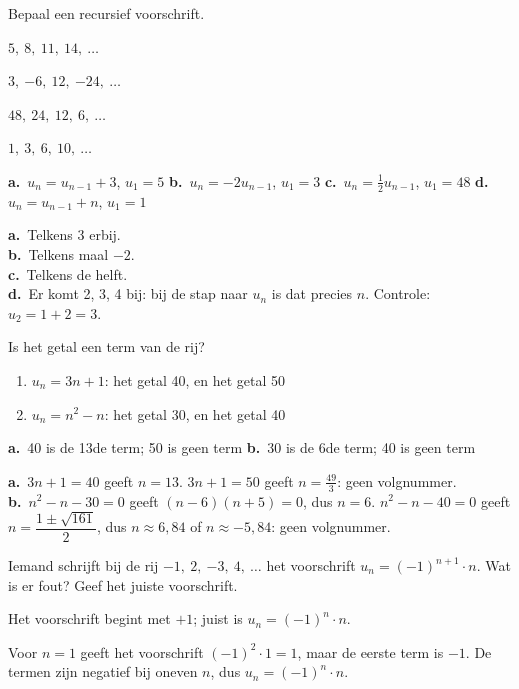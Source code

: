 \begin{oefeningen}
\begin{oefening}[1]\label{oef:h1-recopst}
Bepaal een recursief voorschrift.
\begin{reeks}
  \item $5,\ 8,\ 11,\ 14,\ \ldots$
  \item $3,\ {-6},\ 12,\ {-24},\ \ldots$
  \item $48,\ 24,\ 12,\ 6,\ \ldots$
  \item $1,\ 3,\ 6,\ 10,\ \ldots$
\end{reeks}
\begin{solution}
\textbf{a.}~$u_n=u_{n-1}+3$, $u_1=5$ \quad \textbf{b.}~$u_n=-2u_{n-1}$, $u_1=3$ \quad \textbf{c.}~$u_n=\tfrac12 u_{n-1}$, $u_1=48$ \quad \textbf{d.}~$u_n=u_{n-1}+n$, $u_1=1$
\end{solution}
\begin{fullsolution}
\textbf{a.}~Telkens 3 erbij.\\
\textbf{b.}~Telkens maal $-2$.\\
\textbf{c.}~Telkens de helft.\\
\textbf{d.}~Er komt 2, 3, 4 bij: bij de stap naar $u_n$ is dat precies $n$. Controle: $u_2=1+2=3$.
\end{fullsolution}
\end{oefening}

\begin{oefening}[1]\label{oef:h1-isterm}
Is het getal een term van de rij?
\begin{enumerate}
  \item $u_n = 3n + 1$: het getal 40, en het getal 50
  \item $u_n = n^2 - n$: het getal 30, en het getal 40
\end{enumerate}
\begin{solution}
\textbf{a.}~40 is de 13de term; 50 is geen term \quad \textbf{b.}~30 is de 6de term; 40 is geen term
\end{solution}
\begin{fullsolution}
\textbf{a.}~$3n+1=40$ geeft $n=13$. $3n+1=50$ geeft $n=\tfrac{49}{3}$: geen volgnummer.\\
\textbf{b.}~$n^2-n-30=0$ geeft $(n-6)(n+5)=0$, dus $n=6$. $n^2-n-40=0$ geeft $n=\dfrac{1\pm\sqrt{161}}{2}$, dus $n\approx 6{,}84$ of $n\approx -5{,}84$: geen volgnummer.
\end{fullsolution}
\end{oefening}

\begin{oefening}[1]
Iemand schrijft bij de rij $-1,\ 2,\ {-3},\ 4,\ \ldots$ het voorschrift $u_n = (-1)^{n+1} \cdot n$. Wat is er fout? Geef het juiste voorschrift.
\begin{solution}
Het voorschrift begint met $+1$; juist is $u_n=(-1)^n\cdot n$.
\end{solution}
\begin{fullsolution}
Voor $n=1$ geeft het voorschrift $(-1)^2\cdot 1=1$, maar de eerste term is $-1$. De termen zijn negatief bij oneven $n$, dus $u_n=(-1)^n\cdot n$.
\end{fullsolution}
\end{oefening}


\end{oefeningen}
